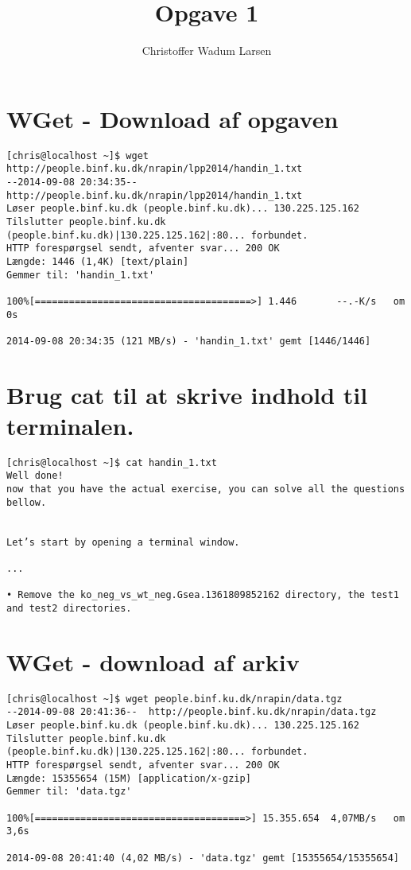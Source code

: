 \documentclass[12pt]{article}
\title{Opgave 1}
\author{Christoffer Wadum Larsen}
\begin{document}
\maketitle

\section{WGet - Download af opgaven}

\begin{lstlisting}
[chris@localhost ~]$ wget http://people.binf.ku.dk/nrapin/lpp2014/handin_1.txt
--2014-09-08 20:34:35--  http://people.binf.ku.dk/nrapin/lpp2014/handin_1.txt
Løser people.binf.ku.dk (people.binf.ku.dk)... 130.225.125.162
Tilslutter people.binf.ku.dk (people.binf.ku.dk)|130.225.125.162|:80... forbundet.
HTTP forespørgsel sendt, afventer svar... 200 OK
Længde: 1446 (1,4K) [text/plain]
Gemmer til: 'handin_1.txt'

100%[======================================>] 1.446       --.-K/s   om 0s      

2014-09-08 20:34:35 (121 MB/s) - 'handin_1.txt' gemt [1446/1446]
\end{lstlisting}

\section{Brug cat til at skrive indhold til terminalen.}

\begin{lstlisting}
[chris@localhost ~]$ cat handin_1.txt 
Well done!
now that you have the actual exercise, you can solve all the questions bellow.


Let’s start by opening a terminal window.

...

• Remove the ko_neg_vs_wt_neg.Gsea.1361809852162 directory, the test1 and test2 directories.
\end{lstlisting}

\section{WGet - download af arkiv}

\begin{lstlisting}
[chris@localhost ~]$ wget people.binf.ku.dk/nrapin/data.tgz
--2014-09-08 20:41:36--  http://people.binf.ku.dk/nrapin/data.tgz
Løser people.binf.ku.dk (people.binf.ku.dk)... 130.225.125.162
Tilslutter people.binf.ku.dk (people.binf.ku.dk)|130.225.125.162|:80... forbundet.
HTTP forespørgsel sendt, afventer svar... 200 OK
Længde: 15355654 (15M) [application/x-gzip]
Gemmer til: 'data.tgz'

100%[=====================================>] 15.355.654  4,07MB/s   om 3,6s   

2014-09-08 20:41:40 (4,02 MB/s) - 'data.tgz' gemt [15355654/15355654]
\end{lstlisting}
\end{document}
